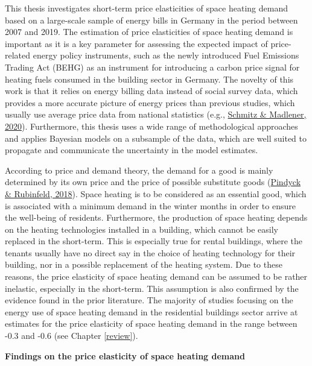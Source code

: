 \documentclass[12pt,twoside]{reedthesis}
\begin{document}
This thesis investigates short-term price elasticities of space heating demand based on a large-scale sample of energy bills in Germany in the period between 2007 and 2019. The estimation of price elasticities of space heating demand is important as it is a key parameter for assessing the expected impact of price-related energy policy instruments, such as the newly introduced Fuel Emissions Trading Act (BEHG) as an instrument for introducing a carbon price signal for heating fuels consumed in the building sector in Germany. The novelty of this work is that it relies on energy billing data instead of social survey data, which provides a more accurate picture of energy prices than previous studies, which usually use average price data from national statistics (e.g., \protect\hyperlink{ref-schmitz_madlener20}{Schmitz \& Madlener, 2020}). Furthermore, this thesis uses a wide range of methodological approaches and applies Bayesian models on a subsample of the data, which are well suited to propagate and communicate the uncertainty in the model estimates.

According to price and demand theory, the demand for a good is mainly determined by its own price and the price of possible substitute goods (\protect\hyperlink{ref-pindyck_rubinfeld18}{Pindyck \& Rubinfeld, 2018}). Space heating is to be considered as an essential good, which is associated with a minimum demand in the winter months in order to ensure the well-being of residents. Furthermore, the production of space heating depends on the heating technologies installed in a building, which cannot be easily replaced in the short-term. This is especially true for rental buildings, where the tenants usually have no direct say in the choice of heating technology for their building, nor in a possible replacement of the heating system. Due to these reasons, the price elasticity of space heating demand can be assumed to be rather inelastic, especially in the short-term. This assumption is also confirmed by the evidence found in the prior literature. The majority of studies focusing on the energy use of space heating demand in the residential buildings sector arrive at estimates for the price elasticity of space heating demand in the range between -0.3 and -0.6 (see Chapter \ref{review}).

\textbf{Findings on the price elasticity of space heating demand}
\end{document}
